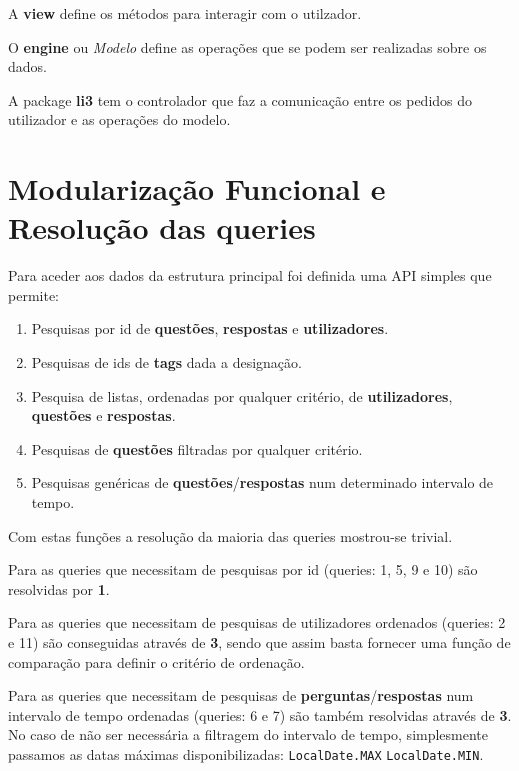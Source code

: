 \documentclass[10pt,a4paper]{report}
\begin{document}
    A \textbf{view} define os métodos para interagir com o utilzador.

    O \textbf{engine} ou \textit{Modelo} define as operações que se podem
    ser realizadas sobre os dados.

    A package \textbf{li3} tem o controlador que faz a comunicação entre os
    pedidos do utilizador e as operações do modelo.

\chapter{Modularização Funcional e Resolução das queries}
    Para aceder aos dados da estrutura principal foi definida uma API
    simples que permite:
    \begin{enumerate}[1.]
        \item Pesquisas por id de \textbf{questões}, \textbf{respostas} e
        \textbf{utilizadores}.
        \item Pesquisas de ids de \textbf{tags} dada a designação.
        \item Pesquisa de listas, ordenadas por qualquer critério, de
        \textbf{utilizadores}, \textbf{questões} e \textbf{respostas}.
        \item Pesquisas de \textbf{questões} filtradas por qualquer critério.
        \item Pesquisas genéricas de \textbf{questões}/\textbf{respostas}
        num determinado intervalo de tempo.
    \end{enumerate}

    Com estas funções a resolução da maioria das queries mostrou-se
    trivial.

    Para as queries que necessitam de pesquisas por id (queries: 1, 5, 9 e 10)
    são resolvidas por \textbf{1}.

    Para as queries que necessitam de pesquisas de utilizadores ordenados
    (queries: 2 e 11) são conseguidas através de \textbf{3}, sendo que assim
    basta fornecer uma função de comparação para definir o critério de
    ordenação.

    Para as queries que necessitam de pesquisas de
    \textbf{perguntas}/\textbf{respostas} num intervalo de tempo ordenadas
    (queries: 6 e 7) são também resolvidas através de \textbf{3}. No caso de não
    ser necessária a filtragem do intervalo de tempo, simplesmente passamos as
    datas máximas disponibilizadas: \texttt{LocalDate.MAX}
    \texttt{LocalDate.MIN}.
\end{document}
